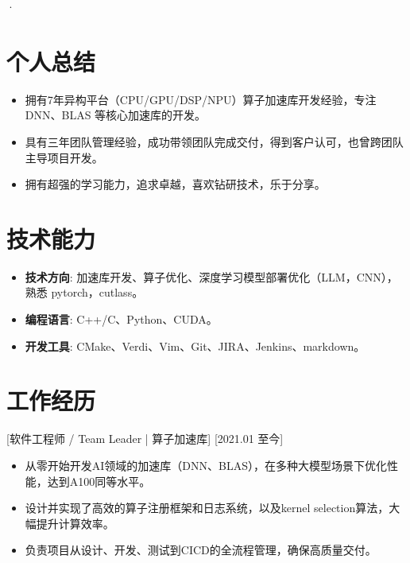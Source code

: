 \documentclass{resume}
\begin{document}


\ResumeTitle·

\section{个人总结}
\begin{itemize}
    \item 拥有7年异构平台（CPU/GPU/DSP/NPU）算子加速库开发经验，专注 DNN、BLAS 等核心加速库的开发。
    \item 具有三年团队管理经验，成功带领团队完成交付，得到客户认可，也曾跨团队主导项目开发。
    \item 拥有超强的学习能力，追求卓越，喜欢钻研技术，乐于分享。
\end{itemize}

\section{技术能力}
\begin{itemize}
    \item \textbf{技术方向}: 加速库开发、算子优化、深度学习模型部署优化（LLM，CNN），熟悉 pytorch，cutlass。
    \item \textbf{编程语言}: C++/C、Python、CUDA。
    \item \textbf{开发工具}: CMake、Verdi、Vim、Git、JIRA、Jenkins、markdown。
\end{itemize}


\section{工作经历}

[软件工程师 / Team Leader | 算子加速库]
[2021.01 至今]
\begin{itemize}
    \item 从零开始开发AI领域的加速库（DNN、BLAS），在多种大模型场景下优化性能，达到A100同等水平。
    \item 设计并实现了高效的算子注册框架和日志系统，以及kernel selection算法，大幅提升计算效率。
    \item 负责项目从设计、开发、测试到CICD的全流程管理，确保高质量交付。
\end{itemize}
\end{document}
